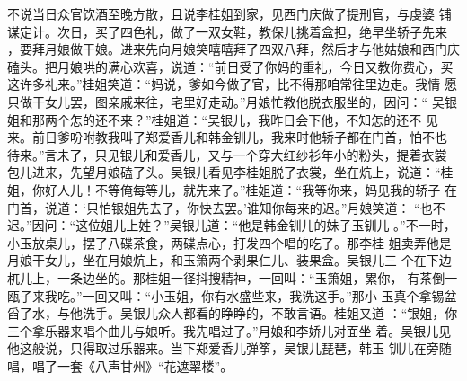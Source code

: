 不说当日众官饮酒至晚方散，且说李桂姐到家，见西门庆做了提刑官，与虔婆
铺谋定计。次日，买了四色礼，做了一双女鞋，教保儿挑着盒担，绝早坐轿子先来
，要拜月娘做干娘。进来先向月娘笑嘻嘻拜了四双八拜，然后才与他姑娘和西门庆
磕头。把月娘哄的满心欢喜，说道：“前日受了你妈的重礼，今日又教你费心，买
这许多礼来。”桂姐笑道：“妈说，爹如今做了官，比不得那咱常往里边走。我情
愿只做干女儿罢，图亲戚来往，宅里好走动。”月娘忙教他脱衣服坐的，因问：“
吴银姐和那两个怎的还不来？”桂姐道：“吴银儿，我昨日会下他，不知怎的还不
见来。前日爹吩咐教我叫了郑爱香儿和韩金钏儿，我来时他轿子都在门首，怕不也
待来。”言未了，只见银儿和爱香儿，又与一个穿大红纱衫年小的粉头，提着衣裳
包儿进来，先望月娘磕了头。吴银儿看见李桂姐脱了衣裳，坐在炕上，说道：“桂
姐，你好人儿！不等俺每等儿，就先来了。”桂姐道：“我等你来，妈见我的轿子
在门首，说道：‘只怕银姐先去了，你快去罢。’谁知你每来的迟。”月娘笑道：
“也不迟。”因问：“这位姐儿上姓？”吴银儿道：“他是韩金钏儿的妹子玉钏儿
。”不一时，小玉放桌儿，摆了八碟茶食，两碟点心，打发四个唱的吃了。那李桂
姐卖弄他是月娘干女儿，坐在月娘炕上，和玉箫两个剥果仁儿、装果盒。吴银儿三
个在下边杌儿上，一条边坐的。那桂姐一径抖搜精神，一回叫：“玉箫姐，累你，
有茶倒一瓯子来我吃。”一回又叫：“小玉姐，你有水盛些来，我洗这手。”那小
玉真个拿锡盆舀了水，与他洗手。吴银儿众人都看的睁睁的，不敢言语。桂姐又道
：“银姐，你三个拿乐器来唱个曲儿与娘听。我先唱过了。”月娘和李娇儿对面坐
着。吴银儿见他这般说，只得取过乐器来。当下郑爱香儿弹筝，吴银儿琵琶，韩玉
钏儿在旁随唱，唱了一套《八声甘州》“花遮翠楼”。

